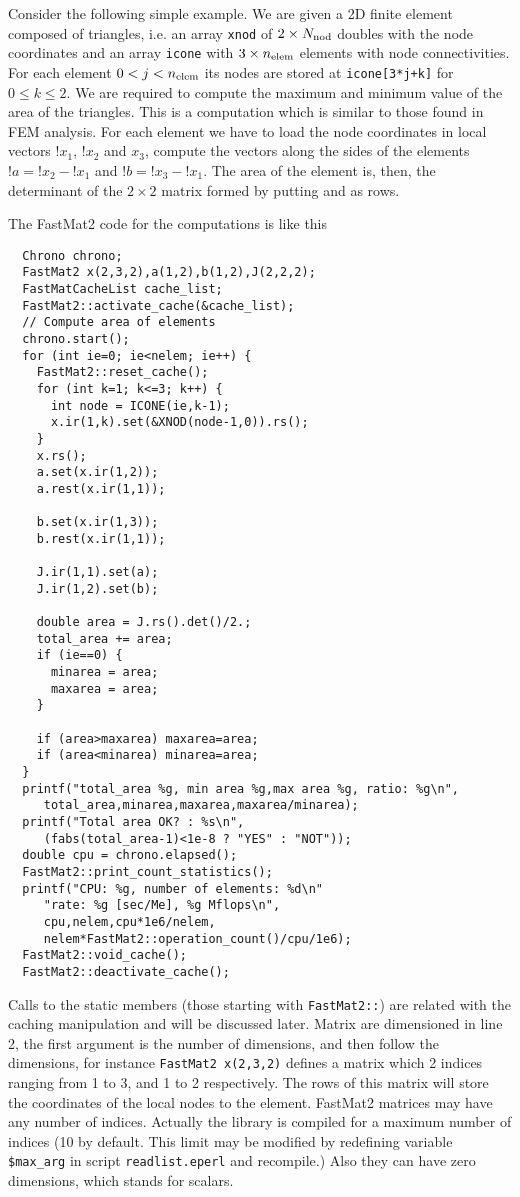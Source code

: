 Consider the following simple example. We are given a 2D finite
element composed of triangles, i.e. an array \verb+xnod+ of
$2\times{N_{\mathrm{nod}}}$ doubles with the node coordinates and an array
\verb+icone+ with $3\times{n_\mathrm{elem}}$ elements with node
connectivities. For each element $0<j<{n_\mathrm{elem}}$ its nodes are stored at
\verb|icone[3*j+k]| for $0\le k\le 2$. We are required to compute the
maximum and minimum value of the area of the triangles. This is a
computation which is similar to those found in FEM analysis. 
For each element we have to load the node coordinates in local vectors
$!x_1$, $!x_2$ and $x_3$, compute the vectors along the sides of the
elements $!a=!x_2-!x_1$ and $!b=!x_3-!x_1$. The area of the element
is, then, the determinant of the $2\times 2$ matrix  formed by
putting  and  as rows.

The FastMat2 code for the computations is like this

\begin{verbatim}
  Chrono chrono;
  FastMat2 x(2,3,2),a(1,2),b(1,2),J(2,2,2);
  FastMatCacheList cache_list;
  FastMat2::activate_cache(&cache_list);
  // Compute area of elements
  chrono.start();
  for (int ie=0; ie<nelem; ie++) {
    FastMat2::reset_cache();
    for (int k=1; k<=3; k++) {
      int node = ICONE(ie,k-1);
      x.ir(1,k).set(&XNOD(node-1,0)).rs();
    }
    x.rs();
    a.set(x.ir(1,2));
    a.rest(x.ir(1,1));

    b.set(x.ir(1,3));
    b.rest(x.ir(1,1));

    J.ir(1,1).set(a);
    J.ir(1,2).set(b);
    
    double area = J.rs().det()/2.;
    total_area += area;
    if (ie==0) {
      minarea = area;
      maxarea = area;
    }

    if (area>maxarea) maxarea=area;
    if (area<minarea) minarea=area;
  }
  printf("total_area %g, min area %g,max area %g, ratio: %g\n",
	 total_area,minarea,maxarea,maxarea/minarea);
  printf("Total area OK? : %s\n",
	 (fabs(total_area-1)<1e-8 ? "YES" : "NOT"));
  double cpu = chrono.elapsed();
  FastMat2::print_count_statistics();
  printf("CPU: %g, number of elements: %d\n"
	 "rate: %g [sec/Me], %g Mflops\n",
	 cpu,nelem,cpu*1e6/nelem,
	 nelem*FastMat2::operation_count()/cpu/1e6);
  FastMat2::void_cache();
  FastMat2::deactivate_cache();

\end{verbatim}

Calls to the static members (those starting with \verb+FastMat2::+)
are related with the caching manipulation and will be discussed
later. Matrix are dimensioned in line 2, the first argument is the
number of dimensions, and then follow the dimensions, for instance
\verb+FastMat2 x(2,3,2)+ defines a matrix which 2 indices ranging from
1 to 3, and 1 to 2 respectively. The rows of this matrix will store
the coordinates of the local nodes to the element. FastMat2 matrices
may have any number of indices. Actually the library is compiled for a
maximum number of indices (10 by default. This limit may be modified
by redefining variable {\tt\$max\_arg} in script \verb+readlist.eperl+
and recompile.) Also they can have zero dimensions, which stands for
scalars. 

